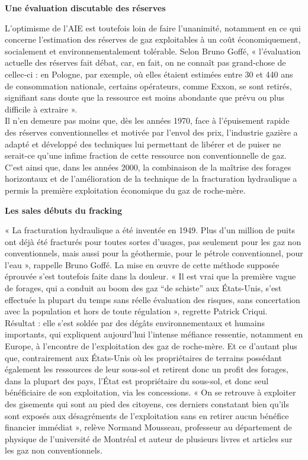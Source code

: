 \documentclass[8pt]{article}
\begin{document}
\textbf{Une évaluation discutable des réserves}

L’optimisme de l’AIE est toutefois loin de faire l’unanimité, notamment en ce qui concerne l’estimation des réserves de gaz exploitables à un coût économiquement, socialement et environnementalement tolérable. Selon Bruno Goffé, « l’évaluation actuelle des réserves fait débat, car, en fait, on ne connaît pas grand-chose de cellec-ci : en Pologne, par exemple, où elles étaient estimées entre 30 et 440 ans de consommation nationale, certains opérateurs, comme Exxon, se sont retirés, signifiant sans doute que la ressource est moins abondante que prévu ou plus difficile à extraire ». \\

Il n’en demeure pas moins que, dès les années 1970, face à l’épuisement rapide des réserves conventionnelles et motivée par l’envol des prix, l’industrie gazière a adapté et développé des techniques lui permettant de libérer et de puiser ne serait-ce qu’une infime fraction de cette ressource non conventionnelle de gaz. C’est ainsi que, dans les années 2000, la combinaison de la maîtrise des forages horizontaux et de l’amélioration de la technique de la fracturation hydraulique a permis la première exploitation économique du gaz de roche-mère.

\textbf{Les sales débuts du fracking}

« La fracturation hydraulique a été inventée en 1949. Plus d’un million de puits ont déjà été fracturés pour toutes sortes d’usages, pas seulement pour les gaz non conventionnels, mais aussi pour la géothermie, pour le pétrole conventionnel, pour l’eau », rappelle Bruno Goffé. La mise en œuvre de cette méthode supposée éprouvée s’est toutefois faite dans la douleur. « Il est vrai que la première vague de forages, qui a conduit au boom des gaz “de schiste” aux États-Unis, s’est effectuée la plupart du temps sans réelle évaluation des risques, sans concertation avec la population et hors de toute régulation », regrette Patrick Criqui. \\


Résultat : elle s’est soldée par des dégâts environnementaux et humains importants, qui expliquent aujourd’hui l’intense méfiance ressentie, notamment en Europe, à l’encontre de l’exploitation des gaz de roche-mère. Et ce d’autant plus que, contrairement aux États-Unis où les propriétaires de terrains possédant également les ressources de leur sous-sol et retirent donc un profit des forages, dans la plupart des pays, l’État est propriétaire du sous-sol, et donc seul bénéficiaire de son exploitation, via les concessions. « On se retrouve à exploiter des gisements qui sont au pied des citoyens, ces derniers constatant bien qu’ils sont exposés aux désagréments de l’exploitation sans en retirer aucun bénéfice financier immédiat », relève Normand Mousseau, professeur au département de physique de l’université de Montréal et auteur de plusieurs livres et articles sur les gaz non conventionnels.\\
\end{document}
